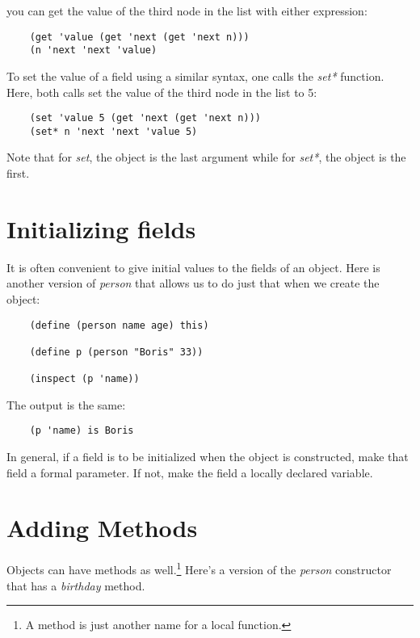 you can get the value of the third node in the
list with
either expression:

\begin{verbatim}
    (get 'value (get 'next (get 'next n)))
    (n 'next 'next 'value)
\end{verbatim}

To set the value of a field using a similar syntax, one calls the {\it set*}
function. Here, both calls set the value of the third node in the list to 5:

\begin{verbatim}
    (set 'value 5 (get 'next (get 'next n)))
    (set* n 'next 'next 'value 5)
\end{verbatim}

Note that for {\it set}, the object is the last argument while for {\it set*},
the object is the first.
    
\section{Initializing fields}

It is often convenient to give initial values to the fields of
an object. Here is another version of {\it person} that allows us
to do just that when we create the object:

\begin{verbatim}
    (define (person name age) this)
        
    (define p (person "Boris" 33))
        
    (inspect (p 'name))
\end{verbatim}

The output is the same:

\begin{verbatim}
    (p 'name) is Boris
\end{verbatim}

In general, if a field is to be initialized when the object
is constructed, make that field a formal parameter. If not,
make the field a locally declared variable.

\section{Adding Methods}

Objects can have methods as well.\footnote{
A method is just another name for a local function.
}
Here's a version of the
{\it person} constructor that has a {\it birthday} method.

